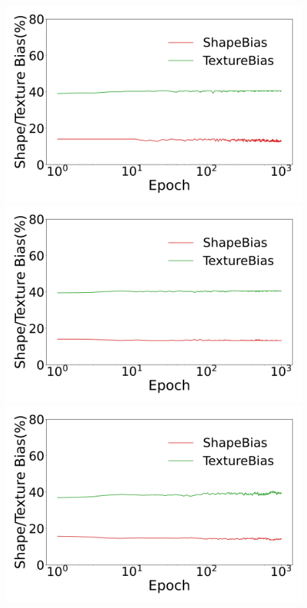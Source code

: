 \begin{figure}[h]
\centering
\begin{minipage}[b]{.48\linewidth}
    \centering
    \includegraphics[width=1\linewidth]{bias_fig/IN_ResNet18/layer5.pdf}
  \end{minipage}
\begin{minipage}[b]{.48\linewidth}
    \centering
    \includegraphics[width=1\linewidth]{bias_fig/IN_ResNet18/layer9.pdf}
  \end{minipage}
\begin{minipage}[b]{.48\linewidth}
    \centering
    \includegraphics[width=1\linewidth]{bias_fig/IN_ResNet18/layer13.pdf}

\end{minipage}
\end{figure}
